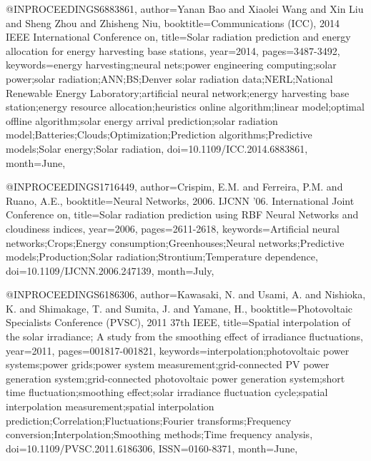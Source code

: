 {@INPROCEEDINGS{6883861, 
author={Yanan Bao and Xiaolei Wang and Xin Liu and Sheng Zhou and Zhisheng Niu}, 
booktitle={Communications (ICC), 2014 IEEE International Conference on}, 
title={Solar radiation prediction and energy allocation for energy harvesting base stations}, 
year={2014}, 
pages={3487-3492}, 
keywords={energy harvesting;neural nets;power engineering computing;solar power;solar radiation;ANN;BS;Denver solar radiation data;NERL;National Renewable Energy Laboratory;artificial neural network;energy harvesting base station;energy resource allocation;heuristics online algorithm;linear model;optimal offline algorithm;solar energy arrival prediction;solar radiation model;Batteries;Clouds;Optimization;Prediction algorithms;Predictive models;Solar energy;Solar radiation}, 
doi={10.1109/ICC.2014.6883861}, 
month={June},}

@INPROCEEDINGS{1716449, 
author={Crispim, E.M. and Ferreira, P.M. and Ruano, A.E.}, 
booktitle={Neural Networks, 2006. IJCNN '06. International Joint Conference on}, 
title={Solar radiation prediction using RBF Neural Networks and cloudiness indices}, 
year={2006}, 
pages={2611-2618}, 
keywords={Artificial neural networks;Crops;Energy consumption;Greenhouses;Neural networks;Predictive models;Production;Solar radiation;Strontium;Temperature dependence}, 
doi={10.1109/IJCNN.2006.247139}, 
month={July},}

@INPROCEEDINGS{6186306, 
author={Kawasaki, N. and Usami, A. and Nishioka, K. and Shimakage, T. and Sumita, J. and Yamane, H.}, 
booktitle={Photovoltaic Specialists Conference (PVSC), 2011 37th IEEE}, 
title={Spatial interpolation of the solar irradiance; A study from the smoothing effect of irradiance fluctuations}, 
year={2011}, 
pages={001817-001821}, 
keywords={interpolation;photovoltaic power systems;power grids;power system measurement;grid-connected PV power generation system;grid-connected photovoltaic power generation system;short time fluctuation;smoothing effect;solar irradiance fluctuation cycle;spatial interpolation measurement;spatial interpolation prediction;Correlation;Fluctuations;Fourier transforms;Frequency conversion;Interpolation;Smoothing methods;Time frequency analysis}, 
doi={10.1109/PVSC.2011.6186306}, 
ISSN={0160-8371}, 
month={June},}

}
